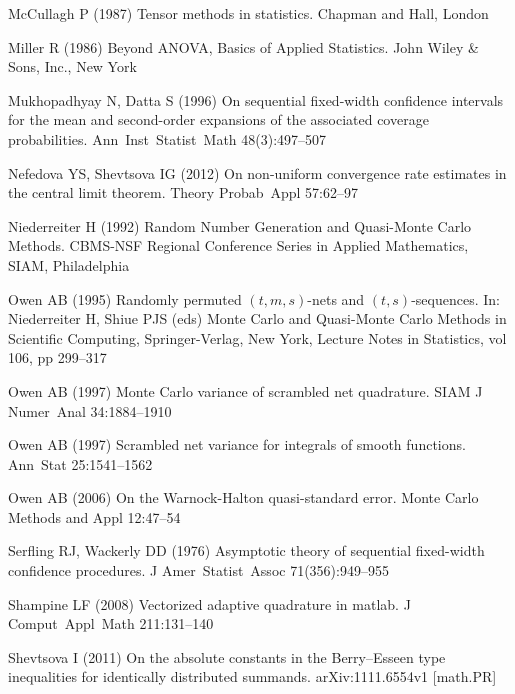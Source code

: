 \documentclass[graybox]{svmult}
\begin{document}
\begin{thebibliography}{29}
McCullagh P (1987) Tensor methods in statistics. Chapman and Hall, London

Miller R (1986) Beyond {ANOVA}, Basics of Applied Statistics. John Wiley \&
  Sons, Inc., New York

Mukhopadhyay N, Datta S (1996) On sequential fixed-width confidence intervals
  for the mean and second-order expansions of the associated coverage
  probabilities. Ann\ Inst\ Statist\ Math 48(3):497--507

Nefedova YS, Shevtsova IG (2012) On non-uniform convergence rate estimates in
  the central limit theorem. Theory Probab\ Appl 57:62--97

Niederreiter H (1992) Random Number Generation and Quasi-{M}onte {C}arlo
  Methods. CBMS-NSF Regional Conference Series in Applied Mathematics, SIAM,
  Philadelphia

Owen AB (1995) Randomly permuted $(t,m,s)$-nets and $(t,s)$-sequences. In:
  Niederreiter H, Shiue PJS (eds) {M}onte {C}arlo and Quasi-{M}onte {C}arlo
  Methods in Scientific Computing, Springer-Verlag, New York, Lecture Notes in
  Statistics, vol 106, pp 299--317

Owen AB (1997{}) Monte {C}arlo variance of scrambled net
  quadrature. SIAM J Numer\ Anal 34:1884--1910

Owen AB (1997{}) Scrambled net variance for integrals of smooth
  functions. Ann\ Stat 25:1541--1562

Owen AB (2006) On the {W}arnock-{H}alton quasi-standard error. Monte Carlo
  Methods and Appl 12:47--54

Serfling RJ, Wackerly DD (1976) Asymptotic theory of sequential fixed-width
  confidence procedures. J Amer\ Statist\ Assoc 71(356):949--955

Shampine LF (2008) Vectorized adaptive quadrature in matlab. J Comput\ Appl\
  Math 211:131--140

Shevtsova I (2011) On the absolute constants in the {B}erry--{E}sseen type
  inequalities for identically distributed summands. arXiv:1111.6554v1
  [math.PR]


\end{thebibliography}
\end{document}
